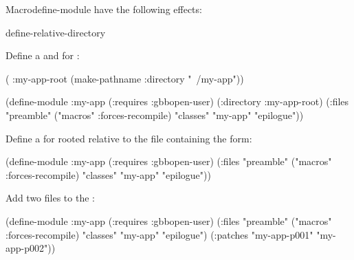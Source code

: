 \documentclass[10pt,twoside,english,pdftex]{article}
\begin{document}
\begin{functiondoc}{Macro}{define-module}{%
    }
 have the following effects: 
%
\W\supp\tabletop
\compilemodulefileoptions

\begin{alsos}{define-relative-directory}
\also[patch]
\end{alsos}

\fnexamples {}%
Define a  and  for :
%
\W\supp
\begin{example}
  ( :my-app-root 
    (make-pathname :directory "~/my-app"))

  (define-module :my-app
    (:requires :gbbopen-user)
    (:directory :my-app-root)
    (:files "preamble"
            ("macros" :forces-recompile)
            "classes"
            "my-app"
            "epilogue"))
\end{example}

Define a  for  rooted relative to the file
containing the  form:
%
\W\supp
\begin{example}
  (define-module :my-app
    (:requires :gbbopen-user)
    (:files "preamble"
            ("macros" :forces-recompile)
            "classes"
            "my-app"
            "epilogue"))
\end{example}

Add two  files to the  :
%
\W\supp
\begin{example}
  (define-module :my-app
    (:requires :gbbopen-user)
    (:files "preamble"
            ("macros" :forces-recompile)
            "classes"
            "my-app"
            "epilogue")
    (:patches "my-app-p001"
              "my-app-p002"))
\end{example}

\end{functiondoc}

\end{document}
